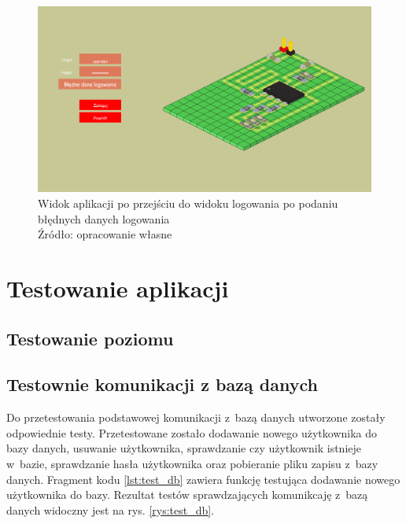 \documentclass[12pt,a4paper]{article} %
\begin{document}
\begin{figure}[h]
	\centering
	\includegraphics[width=15cm]{images/login_menu.png}
	\caption{Widok aplikacji po przejściu do widoku logowania po podaniu błędnych danych logowania  \\ Źródło: opracowanie własne}
	\label{rys:login_menu}
\end{figure} 

\clearpage
\section{Testowanie aplikacji}
\subsection{Testowanie poziomu}


\subsection{Testownie komunikacji z bazą danych}
\aka Do przetestowania podstawowej komunikacji z~bazą danych utworzone zostały odpowiednie testy. Przetestowane zostało dodawanie nowego użytkownika do bazy danych, usuwanie użytkownika, sprawdzanie czy użytkownik istnieje w~bazie, sprawdzanie hasła użytkownika oraz pobieranie pliku zapisu z~bazy danych. Fragment kodu \ref{lst:test_db} zawiera funkcję testująca dodawanie nowego użytkownika do bazy. Rezultat testów sprawdzających komunikcaję z~bazą danych widoczny jest na rys. \ref{rys:test_db}.


\end{document}
